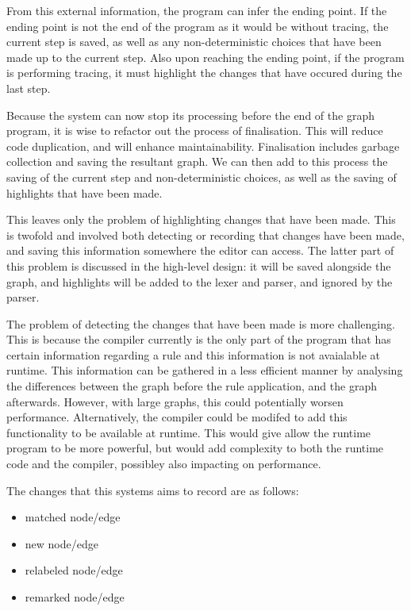 \documentclass{UoYCSproject}
\begin{document}
From this external information, the program can infer the ending point. If the ending point is not the end of the program as it would be without tracing, the current step is saved, as well as any non-deterministic choices that have been made up to the current step. Also upon reaching the ending point, if the program is performing tracing, it must highlight the changes that have occured during the last step.

Because the system can now stop its processing before the end of the graph program, it is wise to refactor out the process of finalisation. This will reduce code duplication, and will enhance maintainability. Finalisation includes garbage collection and saving the resultant graph. We can then add to this process the saving of the current step and non-deterministic choices, as well as the saving of highlights that have been made.

This leaves only the problem of highlighting changes that have been made. This is twofold and involved both detecting or recording that changes have been made, and saving this information somewhere the editor can access. The latter part of this problem is discussed in the high-level design: it will be saved alongside the graph, and highlights will be added to the lexer and parser, and ignored by the parser. 

The problem of detecting the changes that have been made is more challenging. This is because the compiler currently is the only part of the program that has certain information regarding a rule and this information is not avaialable at runtime. This information can be gathered in a less efficient manner by analysing the differences between the graph before the rule application, and the graph afterwards. However, with large graphs, this could potentially worsen performance. Alternatively, the compiler could be modifed to add this functionality to be available at runtime. This would give allow the runtime program to be more powerful, but would add complexity to both the runtime code and the compiler, possibley also impacting on performance.

The changes that this systems aims to record are as follows:
\begin{itemize}
	\item matched node/edge
	\item new node/edge
	\item relabeled node/edge
	\item remarked node/edge
\end{itemize}
\end{document}
